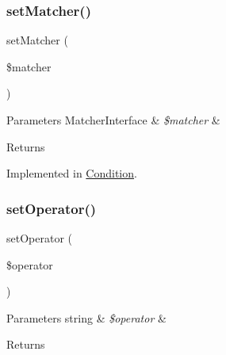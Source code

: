 \mbox{\label{interface_pes_1_1_query_1_1_condition_interface_a0d9ceb80245da7ba5be1dbcee4d98a4e}} 
\subsubsection{\texorpdfstring{set\+Matcher()}{setMatcher()}}
{\footnotesize\ttfamily set\+Matcher (\begin{DoxyParamCaption}\item[{\mbox{\hyperlink{interface_pes_1_1_query_1_1_matcher_1_1_matcher_interface}{Matcher\+Interface}}}]{\$matcher }\end{DoxyParamCaption})}


\begin{DoxyParams}[1]{Parameters}
Matcher\+Interface & {\em \$matcher} & \\
\hline
\end{DoxyParams}
\begin{DoxyReturn}{Returns}

\end{DoxyReturn}


Implemented in \mbox{\hyperlink{class_pes_1_1_query_1_1_condition_a0d9ceb80245da7ba5be1dbcee4d98a4e}{Condition}}.

\mbox{\label{interface_pes_1_1_query_1_1_condition_interface_af7996c125b44ce3a42130ccc56edf9f4}} 
\subsubsection{\texorpdfstring{set\+Operator()}{setOperator()}}
{\footnotesize\ttfamily set\+Operator (\begin{DoxyParamCaption}\item[{}]{\$operator }\end{DoxyParamCaption})}


\begin{DoxyParams}[1]{Parameters}
string & {\em \$operator} & \\
\hline
\end{DoxyParams}
\begin{DoxyReturn}{Returns}

\end{DoxyReturn}


